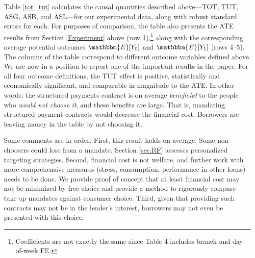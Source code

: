 \documentclass[12pt, a4paper]{article}
\begin{document}



Table \ref{tot_tut} calculates the causal quantities described above---TOT, TUT, ASG, ASB, and ASL---for our experimental data, along with robust standard errors for each. 
For purposes of comparison, the table also presents the ATE results from Section \ref{Experiment} above (row 1),\footnote{Coefficients are not exactly the same since Table 4 includes branch and day-of-week FE.} along with the corresponding average potential outcomes $\mathbbm{E}[Y_0]$ and $\mathbbm{E}[Y_1]$ (rows 4--5).
The columns of the table correspond to different outcome variables defined above.
We are now in a position to report one of the important results in the paper. For all four outcome definitions, the TUT effect is positive, statistically and economically significant, and comparable in magnitude to the ATE.
In other words: the structured payments contract is on average \emph{beneficial} to the people who \emph{would not choose it}, and these benefits are large. That is, mandating structured payment contracts would decrease the financial cost. Borrowers are leaving money in the table by not choosing it. 

Some comments are in order. First, this result holds on average. Some non-choosers could lose from a mandate. Section \ref{sec:RF} assesses personalized targeting strategies. Second, financial cost is not welfare, and further work with more comprehensive measures (stress, consumption, performance in other loans) needs to be done. We provide proof of concept that at least financial cost may not be minimized by free choice and provide a method to rigorously compare take-up mandates against consumer choice. Third, given that providing such contracts may not be in the lender's interest, borrowers may not even be presented with this choice.
\end{document}

